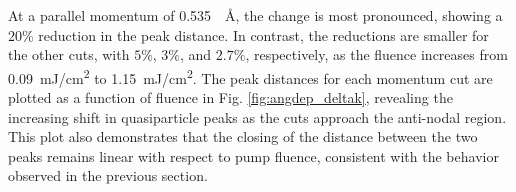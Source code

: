 


At a parallel momentum of \qty{0.535}{\per\angstrom}, the change is most pronounced, showing a $20\%$ reduction in the peak distance.
In contrast, the reductions are smaller for the other cuts, with $5\%$, $3\%$, and $2.7\%$, respectively, as the fluence increases from \qty{0.09}{\milli\joule/\centi\meter\squared} to \qty{1.15}{\milli\joule/\centi\meter\squared}.
The peak distances for each momentum cut are plotted as a function of fluence in Fig. \ref{fig:angdep_deltak}, revealing the increasing shift in quasiparticle peaks as the cuts approach the anti-nodal region.
This plot also demonstrates that the closing of the distance between the two peaks remains linear with respect to pump fluence, consistent with the behavior observed in the previous section.

